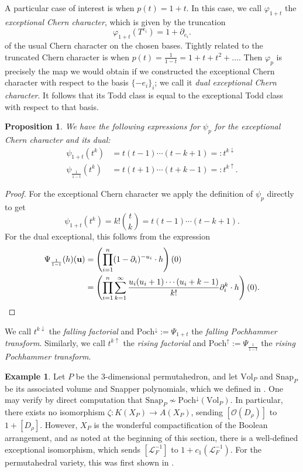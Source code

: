 \documentclass[oneside]{amsart}
\theoremstyle{plain}
\newtheorem{proposition}[theorem]{Proposition}
\theoremstyle{definition}
\newtheorem{example}[theorem]{Example}
\newcommand{\cL}{{\mathcal{L}}}
\newcommand{\cO}{{\mathcal{O}}}
\newcommand{\Vol}{{\mathrm{Vol}}}
\newcommand{\Snap}{{\mathrm{Snap}}}
\newcommand{\Poch}{{\mathrm{Poch}}}
\renewcommand{\vec}[1]{\ensuremath{\mathbf{#1}}}
\begin{document}
A particular case of interest is when $p(t) = 1 + t$. In this case,
we call $\varphi_{1 + t}$ the \emph{exceptional Chern character}, which is given by the truncation
\[
    \varphi_{1 + t}(T^{e_i})=1+\partial_{e_i}.
\]
of the usual Chern character on the chosen bases.  Tightly related to the truncated Chern character is when $p(t) = \frac{1}{1 - t} = 1 + t + t^2 + \dots$.
Then $\varphi_p$ is precisely the map we would obtain if we constructed the exceptional Chern character with respect to the basis $\{-e_i\}_i$; we call it \emph{dual exceptional Chern character}.  It follows that its Todd class is equal to the exceptional Todd class with respect to that basis.

\begin{proposition}\label{prop:exceptional and dual exceptional}
    We have the following expressions for $\psi_p$ for the exceptional Chern character and its dual:
    \begin{align*}
     \psi_{1 + t}(t^k)  & = t(t - 1)\cdots (t - k + 1) =: t^{k\downarrow}\\
        \psi_{\frac{1}{1-t}}(t^k) & = t(t + 1)\cdots(t + k - 1) =: t^{k\uparrow}.
    \end{align*}
\end{proposition}
\begin{proof}
    For the exceptional Chern character we apply the definition of $\psi_p$ directly to get
    \[
    \psi_{1 + t}(t^k) = k!\binom{t}{k} = t(t - 1)\cdots (t - k + 1).
    \]
For the dual exceptional, this follows from the expression
\begin{align*}
    \Psi_{\frac{1}{1-t}}(h)(\vec u) &= \left(\prod_{i = 1}^n (1 - \partial_i)^{-u_i}\cdot h\right)(0)\\
    &= \left(\prod_{i = 1}^n \sum_{k = 1}^\infty \frac{u_i(u_i + 1)\cdots(u_i + k - 1)}{k!} \partial_i^k \cdot h\right)(0).
    \qedhere
\end{align*}
\end{proof}

We call $t^{k\downarrow}$ the \emph{falling factorial}
and $\Poch^{\downarrow} := \Psi_{1 + t}$ the \emph{falling Pochhammer transform}. Similarly, we call
$t^{k\uparrow}$ the \emph{rising factorial} and $\Poch^{\uparrow} := \Psi_{\frac{1}{1 - t}}$
the \emph{rising Pochhammer transform}.


\begin{example}
\label{ex:perumutahedron-no-exceptional}
    Let $P$ be the 3-dimensional permutahedron, and let $\Vol_P$ and $\Snap_P$ be its associated volume and Snapper polynomials, which we defined in .
    One may verify by direct computation that $\Snap_P \not\sim \Poch^\downarrow(\Vol_P)$.
    In particular, there exists no isomorphism $\zeta: K(X_P) \to A(X_P)$, sending $[\cO(D_\rho)]$ to $1 + [D_\rho]$.
    However, $X_P$ is the wonderful compactification of the Boolean arrangement, and as noted at the beginning of this section, there is a well-defined exceptional isomorphism, which sends $[\cL_F^{-1}]$ to $1 + c_1(\cL_F^{-1})$. For the permutahedral variety, this was first shown in \cite[Theorem D]{BEST2023}.
\end{example}
\end{document}
